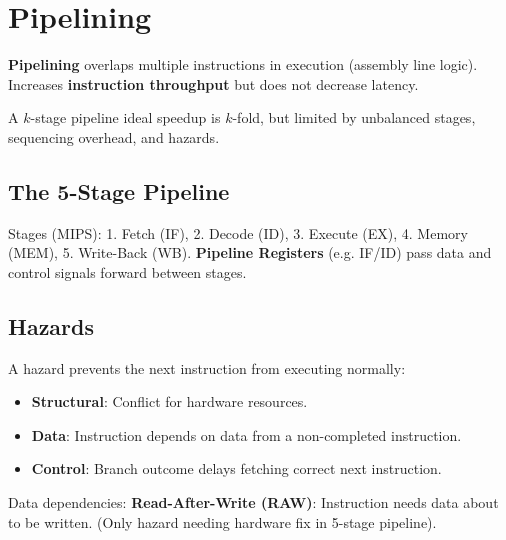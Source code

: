 \section{Pipelining}

\begin{definition}
\textbf{Pipelining} overlaps multiple instructions in execution (assembly line logic). Increases \textbf{instruction throughput} but does not decrease latency.
\end{definition}

\begin{theorem}
A $k$-stage pipeline ideal speedup is $k$-fold, but limited by unbalanced stages, sequencing overhead, and hazards.
\end{theorem}

\subsection{The 5-Stage Pipeline}

\begin{definition}
Stages (MIPS): 1. Fetch (IF), 2. Decode (ID), 3. Execute (EX), 4. Memory (MEM), 5. Write-Back (WB).
\textbf{Pipeline Registers} (e.g. IF/ID) pass data and control signals forward between stages.
\end{definition}

\subsection{Hazards}

\begin{definition}
A hazard prevents the next instruction from executing normally:
\begin{itemize}
    \item \textbf{Structural}: Conflict for hardware resources.
    \item \textbf{Data}: Instruction depends on data from a non-completed instruction.
    \item \textbf{Control}: Branch outcome delays fetching correct next instruction.
\end{itemize}
\end{definition}

\begin{definition}
Data dependencies:
\textbf{Read-After-Write (RAW)}: Instruction needs data about to be written. (Only hazard needing hardware fix in 5-stage pipeline).
\end{definition}

